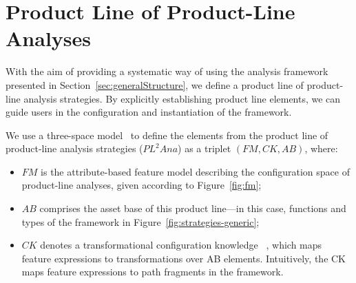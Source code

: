 
\section{Product Line of Product-Line Analyses}





\label{sec:pl2ana}

With the aim of providing a systematic way of using the analysis framework presented in Section~\ref{sec:generalStructure}, 
we define a product line of product-line analysis strategies. By explicitly establishing product line elements, we can guide users in the configuration and instantiation of the framework. 

We use a three-space model~\cite{BorbaPLRefinement} to define the elements from the product line of product-line analysis strategies ($PL^{2}Ana$) as a triplet $(FM,CK,AB)$, where: 

\begin{itemize}
	\item $FM$ is the attribute-based feature model describing the configuration space of product-line analyses, given according to Figure~\ref{fig:fm};
	\item $AB$ comprises the asset base of this product line---in this case, functions and types of the framework in Figure~\ref{fig:strategies-generic};
	\item $CK$ denotes a transformational configuration knowledge~\cite{DOPTransformational} , which maps feature expressions to transformations over AB elements. Intuitively, the CK maps feature expressions to path fragments in the framework.
\end{itemize}


